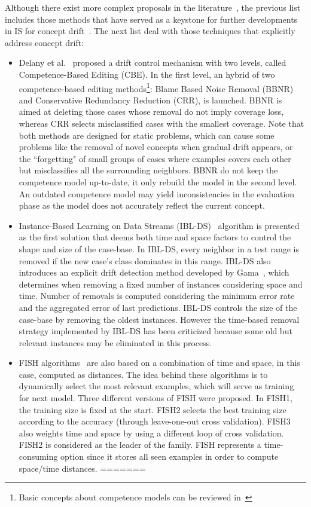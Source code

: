 \documentclass[preprint,12pt]{elsarticle}
\begin{document}
Although there exist more complex proposals in the literature~\cite{garcia12}, the previous list includes those methods that have served as a keystone for further developments in IS for concept drift~\cite{lu16}. The next list deal with those techniques that explicitly address concept drift:

\begin{itemize}
	\item Delany et al.~\cite{delany05} proposed a drift control mechanism with two levels, called Competence-Based Editing (CBE). In the first level, an hybrid of two competence-based editing methods\footnote{Basic concepts about competence models can be reviewed in~\cite{smyth95}}: Blame Based Noise Removal (BBNR) and Conservative Redundancy Reduction (CRR), is launched. BBNR is aimed at deleting those cases whose removal do not imply coverage loss, whereas CRR selects misclassified cases with the smallest coverage. Note that both methods are designed for static problems, which can cause some problems like the removal of novel concepts when gradual drift appears, or the ``forgetting" of small groups of cases where examples covers each other but misclassifies all the surrounding neighbors. BBNR do not keep the competence model up-to-date, it only rebuild the model in the second level. An outdated competence model may yield inconsistencies in the evaluation phase as the model does not accurately reflect the current concept.
	\item Instance-Based Learning on Data Streams (IBL-DS)~\cite{berin07} algorithm is presented as the first solution that deems both time and space factors to control the shape and size of the case-base. In IBL-DS, every neighbor in a test range is removed if the new case's class dominates in this range. IBL-DS also introduces an explicit drift detection method developed by Gama~\cite{gama04}, which determines when removing a fixed number of instances considering space and time. Number of removals is computed considering the minimum error rate and the aggregated error of last predictions. IBL-DS controls the size of the case-base by removing the oldest instances. However the time-based removal strategy implemented by IBL-DS has been criticized because some old but relevant instances may be eliminated in this process.
	\item FISH algorithms~\cite{zlio11} are also based on a combination of time and space, in this case, computed as distances. The idea behind these algorithms is to dynamically select the most relevant examples, which will serve as training for next model. Three different versions of FISH were proposed. In FISH1, the training size is fixed at the start. FISH2 selects the best training size according to the accuracy (through leave-one-out cross validation). FISH3 also weights time and space by using a different loop of cross validation. FISH2 is considered as the leader of the family. FISH represents a time-consuming option since it stores all seen examples in order to compute space/time distances.
=======


\end{itemize}
\end{document}
